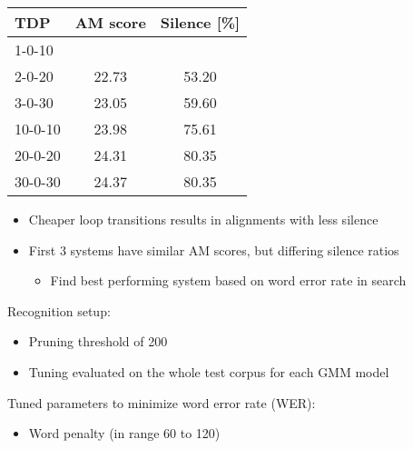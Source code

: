 \documentclass[11pt, a4paper, landscape]{article}
\begin{document}
\begin{center}
\begin{tabular}{| l |  c | c |} \toprule
  TDP        & AM score           & Silence [\%]      \\ \midrule
  1-0-10     & \color{red}{22.68} & \color{red}{43.48}\\
  2-0-20     & 22.73              & 53.20             \\
  3-0-30     & 23.05              & 59.60             \\ \midrule
  10-0-10    & 23.98              & 75.61             \\
  20-0-20    & 24.31              & 80.35             \\
  30-0-30    & 24.37              & 80.35             \\ \bottomrule
\end{tabular}
\end{center}
\vspace{10pt}
\begin{itemize}
	\item Cheaper loop transitions results in alignments with less silence
	\item First 3 systems have similar AM scores, but differing silence ratios
  \begin{itemize}
    \item Find best performing system based on word error rate in search
  \end{itemize}
\end{itemize}
\vfill


\NewPage{}
\vfill
Recognition setup:
\begin{itemize}
	\item Pruning threshold of 200
	\item Tuning evaluated on the whole test corpus for each GMM model
\end{itemize}
\vspace{20pt}
Tuned parameters to minimize word error rate (WER):
\begin{itemize}	
	\item Word penalty (in range 60 to 120)
\end{itemize}

\end{document}
